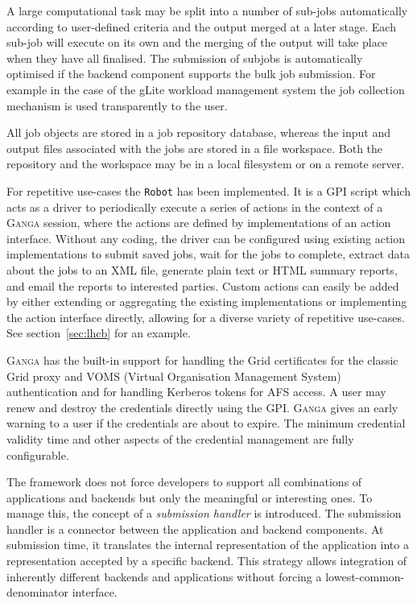 \documentclass{elsart}
\def\ganga {\textsc{Ganga}\xspace}
\def\GPI{GPI\xspace}
\newcommand{\code}[1]{\texttt{#1}}
\begin{document}
A large computational task may be split into a number of sub-jobs
automatically according to user-defined criteria and the output merged
at a later stage. Each sub-job will execute on its own and the merging
of the output will take place when they have all finalised. The
submission of subjobs is automatically optimised if the backend
component supports the bulk job submission. For example in the case of
the gLite \cite{LCG} workload management system the job collection
mechanism is used transparently to the user.

All job objects are stored in a job repository database, whereas the input
and output files associated with the jobs are stored in a file workspace. Both
the repository and the workspace may be in a local filesystem or on a remote
server.

For repetitive use-cases the \code{Robot} has been implemented. It is a \GPI
script which acts as a driver to periodically execute a series of
actions in the context of a \ganga session, where the actions are defined by
implementations of an action interface.  Without any coding, the driver can be
configured using existing action implementations to submit saved jobs, wait
for the jobs to complete, extract data about the jobs to an XML file, generate
plain text or HTML summary reports, and email the reports to interested
parties. Custom actions can easily be added by either extending or aggregating
the existing implementations or implementing the action interface directly,
allowing for a diverse variety of repetitive use-cases. See
section~\ref{sec:lhcb} for an example.


\ganga has the built-in support for handling the Grid certificates for
the classic Grid proxy and VOMS (Virtual Organisation Management
System) authentication and for handling Kerberos\cite{Kerberos} tokens
for AFS \cite{AFS} access. A user may renew and destroy the
credentials directly using the GPI. \ganga gives an early warning to a
user if the credentials are about to expire. The minimum credential
validity time and other aspects of the credential management are fully
configurable.

The framework does not force developers to support all combinations of
applications and backends but only the meaningful or interesting ones. To manage
this, the concept of a {\em submission handler} is introduced. The submission
handler is a connector between the application and backend components. At
submission time, it translates the internal representation of the application
into a representation accepted by a specific backend. This strategy allows
integration of inherently different backends and applications without forcing
a lowest-common-denominator interface.
\end{document}
